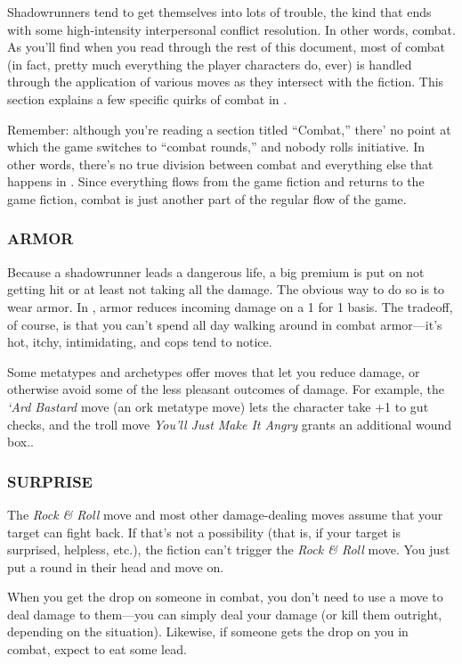 \documentclass[oneside,10pt]{article}
\begin{document}
\begin{multicols}{2}

Shadowrunners tend to get themselves into lots of trouble,
the kind that ends with some high-intensity interpersonal conflict resolution. In other words, combat. As you’ll find
when you read through the rest of this document, most of
combat (in fact, pretty much everything the player characters
do, ever) is handled through the application of various moves
as they intersect with the fiction. This section explains a few
specific quirks of combat in \SW{}.

Remember: although you’re reading a section titled “Combat,” there’ no point at which the game switches to “combat
rounds,” and nobody rolls initiative. In other words, there’s
no true division between combat and everything else that
happens in \SW{}. Since everything flows from the
game fiction and returns to the game fiction, combat is just
another part of the regular flow of the game.



\subsubsection{ARMOR}
Because a shadowrunner leads a dangerous life, a big premium is put on not getting hit or at least not taking all the
damage. The obvious way to do so is to wear armor. In \SW{}, armor reduces incoming damage on a 1 for 1 basis.
The tradeoff, of course, is that you can’t spend all day walking
around in combat armor—it’s hot, itchy, intimidating, and
cops tend to notice.

Some metatypes and archetypes offer moves that let you reduce damage, or otherwise avoid some of the less pleasant
outcomes of damage. For example, the \textit{‘Ard Bastard} move
(an ork metatype move) lets the character take +1 to gut
checks, and the troll move \textit{You’ll Just Make It Angry} grants an
additional wound box..


\subsubsection{SURPRISE}
The \textit{Rock \& Roll} move and most other damage-dealing moves
assume that your target can fight back. If that’s not a possibility (that is, if your target is surprised, helpless, etc.), the fiction
can’t trigger the \textit{Rock \& Roll} move. You just put a round in
their head and move on.

When you get the drop on someone in combat, you don’t
need to use a move to deal damage to them—you can simply deal your damage (or kill them outright, depending on
the situation). Likewise, if someone gets the drop on you in
combat, expect to eat some lead.



\end{multicols}
\end{document}

